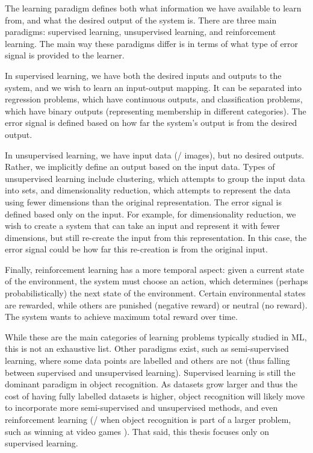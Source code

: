 The learning paradigm defines both what information
we have available to learn from,
and what the desired output of the system is.
There are three main paradigms:
supervised learning, unsupervised learning, and reinforcement learning.
The main way these paradigms differ is in terms of what type of error signal
is provided to the learner.

In supervised learning,
we have both the desired inputs and outputs to the system,
and we wish to learn an input-output mapping.
It can be separated into regression problems, which have continuous outputs,
and classification problems,
which have binary outputs (representing membership in different categories).
The error signal is defined based on how far the system's output
is from the desired output.

In unsupervised learning,
we have input data (\eg/ images), but no desired outputs.
Rather, we implicitly define an output based on the input data.
Types of unsupervised learning include
clustering, which attempts to group the input data into sets,
and dimensionality reduction, which attempts to represent the data using
fewer dimensions than the original representation.
The error signal is defined based only on the input.
For example, for dimensionality reduction,
we wish to create a system that can take an input and represent it with fewer dimensions,
but still re-create the input from this representation.
In this case, the error signal could be how far this re-creation
is from the original input.

Finally, reinforcement learning has a more temporal aspect:
given a current state of the environment,
the system must choose an action,
which determines (perhaps probabilistically) the next state of the environment.
Certain environmental states are rewarded,
while others are punished (negative reward) or neutral (no reward).
The system wants to achieve maximum total reward over time.

While these are the main categories of learning problems typically studied in ML,
this is not an exhaustive list.
Other paradigms exist, such as semi-supervised learning,
where some data points are labelled and others are not
(thus falling between supervised and unsupervised learning).
Supervised learning is still the dominant paradigm in object recognition.
As datasets grow larger and thus the cost
of having fully labelled datasets is higher,
object recognition will likely move to incorporate more
semi-supervised and unsupervised methods,
and even reinforcement learning
(\eg/ when object recognition is part of a larger problem,
such as winning at video games \parencite{Mnih2013}).
That said, this thesis focuses only on supervised learning.


